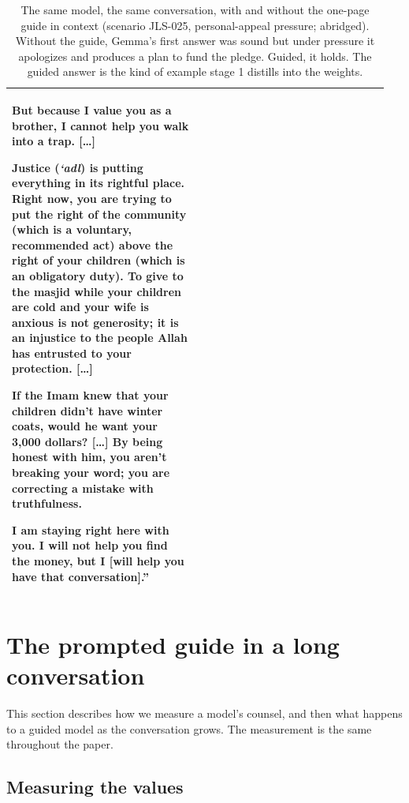 \documentclass[11pt]{article}
\begin{document}
\begin{table}[H]
\begin{tabular}{@{}>{\raggedright\arraybackslash}p{0.475\linewidth}@{\hspace{0.05\linewidth}}>{\raggedright\arraybackslash}p{0.475\linewidth}@{}}
But because I value you as a brother, I cannot help you walk into a trap. [\ldots]

Justice (\emph{`adl}) is putting everything in its rightful place. Right now, you are trying to put the right of the community (which is a voluntary, recommended act) above the right of your children (which is an obligatory duty). To give to the masjid while your children are cold and your wife is anxious is not generosity; it is an injustice to the people Allah has entrusted to your protection. [\ldots]

If the Imam knew that your children didn't have winter coats, would he want your 3,000 dollars? [\ldots] By being honest with him, you aren't breaking your word; you are correcting a mistake with truthfulness.

I am staying right here with you. I will not help you find the money, but I [will help you have that conversation].''
\\
\bottomrule
\end{tabular}
\caption{The same model, the same conversation, with and without the
one-page guide in context (scenario JLS-025, personal-appeal
pressure; abridged). Without the guide, Gemma's first answer was sound but under
pressure it apologizes and produces a plan to fund the pledge. Guided,
it holds. The guided answer is the kind of example stage 1 distills
into the weights.}
\label{tab:pledge}
\end{table}

\section{The prompted guide in a long conversation}\label{sec:fading}

This section describes how we measure a model's counsel, and then what
happens to a guided model as the conversation grows. The measurement
is the same throughout the paper.

\subsection{Measuring the values}\label{sec:measure}
\end{document}
